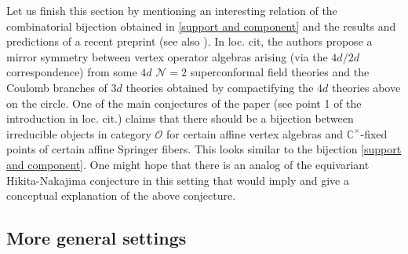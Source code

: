 \documentclass[12pt]{amsart}
\begin{document}
Let us finish this section by mentioning an interesting relation of the combinatorial bijection obtained in \ref{support and component} and the results and predictions of a recent preprint \cite{Peng_Xie_Yan_Mirror} (see also \cite{yi_ya}). In loc. cit, the authors propose a mirror symmetry between  vertex operator algebras arising (via the $4d/2d$ correspondence) from some $4d$ $\mathcal{N}=2$ superconformal field theories and the Coulomb branches of  $3d$ theories obtained by compactifying the $4d$ theories above on the circle. 
One of the main conjectures of the paper (see point 1 of the introduction in loc. cit.) claims that there should be a bijection between irreducible objects in category $\mathcal{O}$ for certain affine vertex algebras and $\mathbb{C}^\times$-fixed points of certain affine Springer fibers. This looks similar to the bijection \ref{support and component}. One might hope that
 there is an analog of the equivariant Hikita-Nakajima conjecture in this setting that would imply and give a conceptual explanation of the above conjecture. 





\subsection{More general settings}\label{sec_more_gen_settings} 
\end{document}
